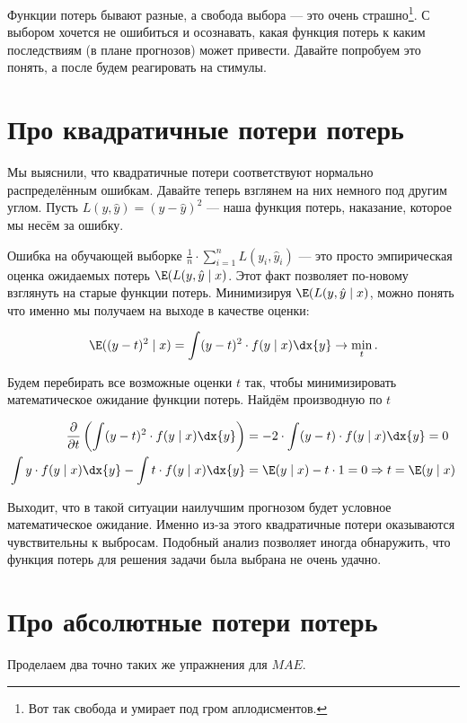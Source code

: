 \documentclass[12pt, a4paper, oneside]{article}
\begin{document}
Функции потерь бывают разные, а свобода выбора --- это очень страшно\footnote{Вот так свобода и умирает под гром аплодисментов.}. С выбором хочется не ошибиться и осознавать, какая функция потерь к каким последствиям (в плане прогнозов) может привести.  Давайте попробуем это понять, а после будем реагировать на стимулы. 

\section{Про квадратичные потери потерь}

Мы выяснили, что квадратичные потери соответствуют  нормально распределённым ошибкам.  Давайте теперь взглянем на них немного под другим углом.  Пусть $L(y, \hat y) = (y - \hat y)^2$ --- наша функция потерь, наказание, которое мы несём за ошибку. 

Ошибка на обучающей выборке $\frac{1}{n} \cdot \sum_{i=1}^n L(y_i, \hat y_i)$ --- это просто эмпирическая оценка ожидаемых потерь $\E(L(y, \hat y \mid x)$. Этот факт позволяет по-новому взглянуть на старые функции потерь. Минимизируя $\E(L(y, \hat y \mid x)$, можно понять что именно мы получаем на выходе в качестве оценки:

\[ \E((y-t)^2 \mid x) = \int (y - t)^2 \cdot f(y \mid x) \dx{y} \to \min_{t}.\]

Будем перебирать все возможные оценки $t$ так, чтобы минимизировать математическое ожидание функции потерь. Найдём производную по $t$

\begin{align*}
\frac{\partial }{\partial t} \left(  \int (y - t)^2 \cdot f(y \mid x) \dx{y}   \right) &= - 2 \cdot \int (y - t) \cdot f(y \mid x) \dx{y} = 0 \\
\int y \cdot f(y \mid x) \dx{y} - \int  t \cdot f(y \mid x) \dx{y} &= \E(y \mid x) - t \cdot 1 =  0 \Rightarrow  t = \E(y \mid x)
\end{align*}

Выходит, что в такой ситуации наилучшим прогнозом будет условное математическое ожидание. Именно из-за этого квадратичные потери оказываются чувствительны к выбросам.  Подобный анализ позволяет иногда обнаружить, что функция потерь для решения задачи была выбрана не очень удачно. 

\section{Про абсолютные потери потерь}

Проделаем два точно таких же упражнения для $MAE$.  
\end{document}
